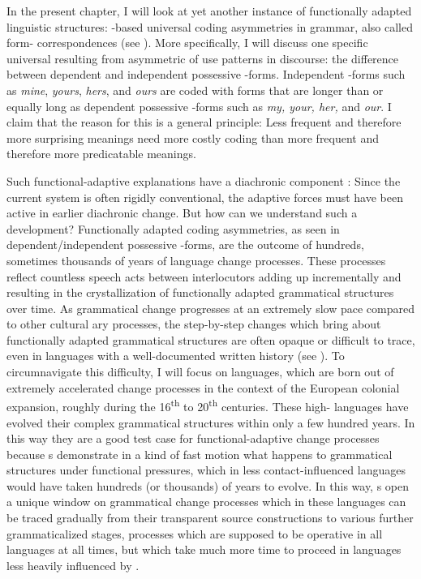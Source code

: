 \documentclass[output=paper]{langsci/langscibook}
\begin{document}
In the present chapter, I will look at yet another instance of functionally adapt\-ed linguistic structures: -based universal coding asymmetries in grammar, also called form- correspondences (see ). More specifically, I will discuss one specific universal  resulting from asymmetric  of use patterns in discourse: the difference between dependent and independent possessive -forms. Independent -forms such as \textit{mine}, \textit{yours}, \textit{hers}, and \textit{ours} are coded with forms that are longer than or equally long as dependent possessive -forms such as \textit{my, your, her,} and \textit{our}. I claim that the reason for this is a general  principle: Less frequent and therefore more surprising meanings need more costly coding than more frequent and therefore more predicatable meanings. 

Such functional-adaptive explanations have a diachronic component \citep{Bybee1988}: Since the current system is often rigidly conventional, the adaptive forces must have been active in earlier diachronic change. But how can we understand such a development? Functionally adapted coding asymmetries, as seen in dependent/independent possessive -forms, are the outcome of hundreds, sometimes thousands of years of language change processes. These processes reflect countless speech acts between interlocutors adding up incrementally and resulting in the crystallization of functionally adapted grammatical structures over time. As grammatical change progresses at an extremely slow pace compared to other cultural ary processes, the step-by-step changes which bring about functionally adapted grammatical structures are often opaque or difficult to trace, even in languages with a well-documented written history (see ). To circumnavigate this difficulty, I will focus on  languages, which are born out of extremely accelerated change processes in the context of the European colonial expansion, roughly during the 16\textsuperscript{th} to 20\textsuperscript{th} centuries. These high- languages have evolved their complex grammatical structures within only a few hundred years. In this way they are a good test case for functional-adaptive change processes because s demonstrate in a kind of fast motion what happens to grammatical structures under functional pressures, which in less contact-influenced languages would have taken hundreds (or thousands) of years to evolve. In this way, s open a unique window on grammatical change processes which in these languages can be traced gradually from their transparent source constructions to various further grammaticalized stages, processes which are supposed to be operative in all languages at all times, but which take much more time to proceed in languages less heavily influenced by . 
\end{document}
